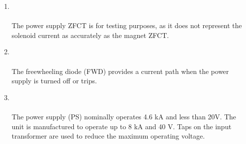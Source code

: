 \begin{enumerate}
\item {\\
\\
{ The power supply ZFCT is for testing purposes, as it does not represent the solenoid current as accurately as the magnet ZFCT.}{ }}

\item {\\
\\
{ The freewheeling diode (FWD) provides a current path when the power supply is turned off or trips.  }{ }}

\item {\\
\\{ The power supply (PS) nominally operates 4.6 kA and less than 20V.  The unit is manufactured to operate up to 8 kA and }{ 40 V.  Taps on the input transformer are used to reduce the maximum operating voltage.}}
\end{enumerate}




\newpage

